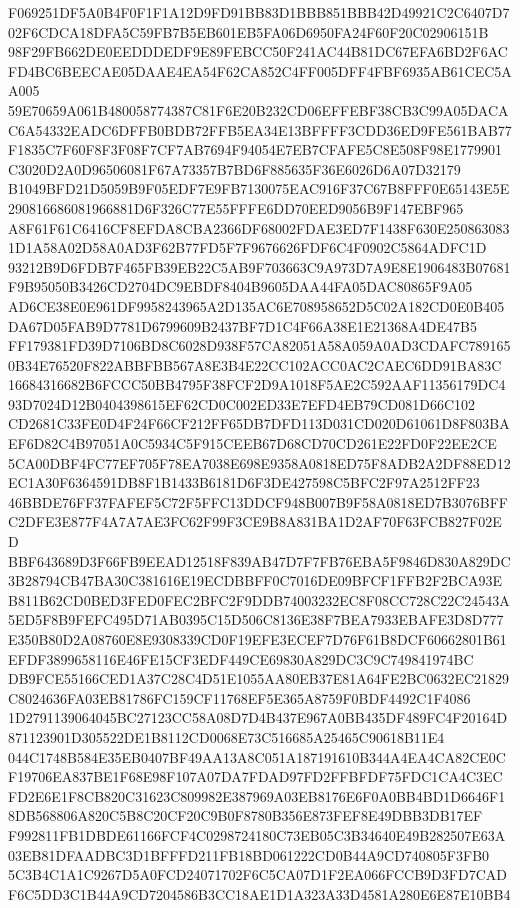 \documentclass[UTF8,fontset=fandol,zihao=-4,a4paper]{ctexart}
\begin{document}
{{F069251DF5A0B4F0F1F1A12D9FD91BB83D1BBB851BBB42D49921C2C6407D702F6CDCA18DFA5C59FB7B5EB601EB5FA06D6950FA24F60F20C02906151B
98F29FB662DE0EEDDDEDF9E89FEBCC50F241AC44B81DC67EFA6BD2F6ACFD4BC6BEECAE05DAAE4EA54F62CA852C4FF005DFF4FBF6935AB61CEC5AA005
59E70659A061B480058774387C81F6E20B232CD06EFFEBF38CB3C99A05DACAC6A54332EADC6DFFB0BDB72FFB5EA34E13BFFFF3CDD36ED9FE561BAB77
F1835C7F60F8F3F08F7CF7AB7694F94054E7EB7CFAFE5C8E508F98E1779901C3020D2A0D96506081F67A73357B7BD6F885635F36E6026D6A07D32179
B1049BFD21D5059B9F05EDF7E9FB7130075EAC916F37C67B8FFF0E65143E5E290816686081966881D6F326C77E55FFFE6DD70EED9056B9F147EBF965
A8F61F61C6416CF8EFDA8CBA2366DF68002FDAE3ED7F1438F630E2508630831D1A58A02D58A0AD3F62B77FD5F7F9676626FDF6C4F0902C5864ADFC1D
93212B9D6FDB7F465FB39EB22C5AB9F703663C9A973D7A9E8E1906483B07681F9B95050B3426CD2704DC9EBDF8404B9605DAA44FA05DAC80865F9A05
AD6CE38E0E961DF9958243965A2D135AC6E708958652D5C02A182CD0E0B405DA67D05FAB9D7781D6799609B2437BF7D1C4F66A38E1E21368A4DE47B5
FF179381FD39D7106BD8C6028D938F57CA82051A58A059A0AD3CDAFC7891650B34E76520F822ABBFBB567A8E3B4E22CC102ACC0AC2CAEC6DD91BA83C
16684316682B6FCCC50BB4795F38FCF2D9A1018F5AE2C592AAF11356179DC493D7024D12B0404398615EF62CD0C002ED33E7EFD4EB79CD081D66C102
CD2681C33FE0D4F24F66CF212FF65DB7DFD113D031CD020D61061D8F803BAEF6D82C4B97051A0C5934C5F915CEEB67D68CD70CD261E22FD0F22EE2CE
5CA00DBF4FC77EF705F78EA7038E698E9358A0818ED75F8ADB2A2DF88ED12EC1A30F6364591DB8F1B1433B6181D6F3DE427598C5BFC2F97A2512FF23
46BBDE76FF37FAFEF5C72F5FFC13DDCF948B007B9F58A0818ED7B3076BFFC2DFE3E877F4A7A7AE3FC62F99F3CE9B8A831BA1D2AF70F63FCB827F02ED
BBF643689D3F66FB9EEAD12518F839AB47D7F7FB76EBA5F9846D830A829DC3B28794CB47BA30C381616E19ECDBBFF0C7016DE09BFCF1FFB2F2BCA93E
B811B62CD0BED3FED0FEC2BFC2F9DDB74003232EC8F08CC728C22C24543A5ED5F8B9FEFC495D71AB0395C15D506C8136E38F7BEA7933EBAFE3D8D777
E350B80D2A08760E8E9308339CD0F19EFE3ECEF7D76F61B8DCF60662801B61EFDF3899658116E46FE15CF3EDF449CE69830A829DC3C9C749841974BC
DB9FCE55166CED1A37C28C4D51E1055AA80EB37E81A64FE2BC0632EC21829C8024636FA03EB81786FC159CF11768EF5E365A8759F0BDF4492C1F4086
1D2791139064045BC27123CC58A08D7D4B437E967A0BB435DF489FC4F20164D871123901D305522DE1B8112CD0068E73C516685A25465C90618B11E4
044C1748B584E35EB0407BF49AA13A8C051A187191610B344A4EA4CA82CE0CF19706EA837BE1F68E98F107A07DA7FDAD97FD2FFBFDF75FDC1CA4C3EC
FD2E6E1F8CB820C31623C809982E387969A03EB8176E6F0A0BB4BD1D6646F18DB568806A820C5B8C20CF20C9B0F8780B356E873FEF8E49DBB3DB17EF
F992811FB1DBDE61166FCF4C0298724180C73EB05C3B34640E49B282507E63A03EB81DFAADBC3D1BFFFD211FB18BD061222CD0B44A9CD740805F3FB0
5C3B4C1A1C9267D5A0FCD24071702F6C5CA07D1F2EA066FCCB9D3FD7CADF6C5DD3C1B44A9CD7204586B3CC18AE1D1A323A33D4581A280E6E87E10BB4
}}
\end{document}
